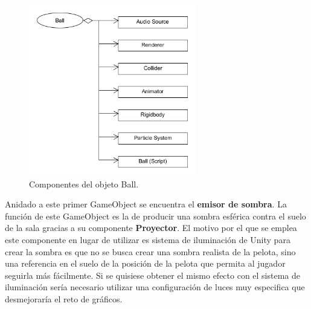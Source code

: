 \begin{figure}[h]
	\includegraphics[width=0.65\textwidth]{images/estructura/fisica/ball}
	\centering
	\caption{Componentes del objeto Ball.}
	\label{ball_object}
\end{figure}

Anidado a este primer GameObject se encuentra el \textbf{emisor de sombra}. La función de este GameObject es la de producir una sombra esférica contra el suelo de la sala gracias a su componente \textbf{Proyector}. El motivo por el que se emplea este componente en lugar de utilizar es sistema de iluminación de Unity para crear la sombra es que no se busca crear una sombra realista de la pelota, sino una referencia en el suelo de la posición de la pelota que permita al jugador seguirla más fácilmente. Si se quisiese obtener el mismo efecto con el sistema de iluminación sería necesario utilizar una configuración de luces muy especifica que desmejoraría el reto de gráficos.

